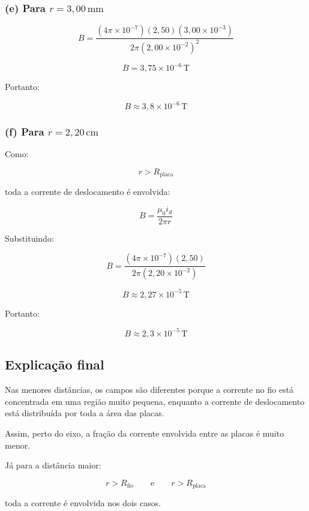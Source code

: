 \documentclass[12pt,a4paper]{article}
\begin{document}
\subsubsection*{(e) Para $r = 3,00\,\text{mm}$}

\[
B =
\frac{
(4\pi\times10^{-7})(2,50)(3,00\times10^{-3})
}
{
2\pi(2,00\times10^{-2})^2
}
\]

\[
B = 3,75\times10^{-6}\,\text{T}
\]

Portanto:

\[
\boxed{
B \approx 3,8\times10^{-6}\,\text{T}
}
\]


\subsubsection*{(f) Para $r = 2,20\,\text{cm}$}

Como:

\[
r > R_{\text{placa}}
\]

toda a corrente de deslocamento é envolvida:

\[
B =
\frac{\mu_0 i_d}{2\pi r}
\]

Substituindo:

\[
B =
\frac{
(4\pi\times10^{-7})(2,50)
}
{
2\pi(2,20\times10^{-2})
}
\]

\[
B \approx 2,27\times10^{-5}\,\text{T}
\]

Portanto:

\[
\boxed{
B \approx 2,3\times10^{-5}\,\text{T}
}
\]

\subsection*{Explicação final}

Nas menores distâncias, os campos são diferentes porque a corrente no
fio está concentrada em uma região muito pequena, enquanto a corrente
de deslocamento está distribuída por toda a área das placas.

Assim, perto do eixo, a fração da corrente envolvida entre as placas é
muito menor.

Já para a distância maior:

\[
r > R_{\text{fio}}
\qquad \text{e} \qquad
r > R_{\text{placa}}
\]

toda a corrente é envolvida nos dois casos.
\end{document}
